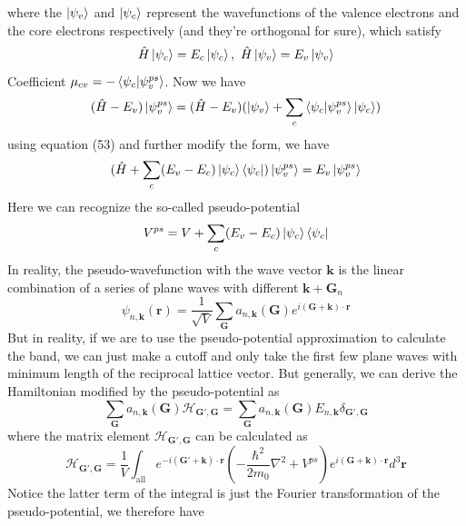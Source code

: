 \documentclass{article}
\begin{document}
where the $\ket{\psi_v}$ and $\ket{\psi_c}$ represent the wavefunctions of the valence electrons and the core electrons respectively (and they're orthogonal for sure), which satisfy\begin{equation}
    \hat{H}\ket{\psi_c}=E_c\ket{\psi_c},~\hat{H}\ket{\psi_v}=E_v\ket{\psi_v}
\end{equation}Coefficient $\mu_{cv}=-\braket{\psi_c|\psi_v^{ps}}$. Now we have\begin{equation}
    (\hat{H}-E_v)\ket{\psi_v^{ps}}=(\hat{H}-E_v)(\ket{\psi_v}+\sum_c\braket{\psi_c|\psi_v^{ps}}\ket{\psi_c})
\end{equation}using equation (53) and further modify the form, we have\begin{equation}
    (\hat{H}+\sum_c(E_v-E_c)\ket{\psi_c}\bra{\psi_c})\ket{\psi_v^{ps}}=E_v\ket{\psi_v^{ps}}
\end{equation}Here we can recognize the so-called pseudo-potential\begin{equation}
    V^{ps}=V+\sum_c(E_v-E_c)\ket{\psi_c}\bra{\psi_c}
\end{equation}In reality, the pseudo-wavefunction with the wave vector $\mathbf{k}$ is the linear combination of a series of plane waves with different $\mathbf{k}+\mathbf{G}_n$\begin{equation}
    \psi_{n,\mathbf{k}}(\mathbf{r})=\frac1{\sqrt{V}}\sum_{\mathbf{G}}a_{n,\mathbf{k}}(\mathbf{G})e^{i(\mathbf{G}+\mathbf{k})\cdot\mathbf{r}}
\end{equation}But in reality, if we are to use the pseudo-potential approximation to calculate the band, we can just make a cutoff and only take the first few plane waves with minimum length of the reciprocal lattice vector. But generally, we can derive the Hamiltonian modified by the pseudo-potential as\begin{equation}
    \sum_{\mathbf{G}}a_{n,\mathbf{k}}(\mathbf{G})\mathcal{H}_{\mathbf{G}',\mathbf{G}}=\sum_{\mathbf{G}}a_{n,\mathbf{k}}(\mathbf{G})E_{n,\mathbf{k}}\delta_{\mathbf{G}',\mathbf{G}}
\end{equation}where the matrix element $\mathcal{H}_{\mathbf{G}',\mathbf{G}}$ can be calculated as\begin{equation}
    \mathcal{H}_{\mathbf{G}',\mathbf{G}}=\frac{1}{V}\int_{\mathrm{all}}e^{-i(\mathbf{G}'+\mathbf{k})\cdot\mathbf{r}}(-\frac{\hbar^2}{2m_0}\nabla^2+V^{ps})e^{i(\mathbf{G}+\mathbf{k})\cdot\mathbf{r}}d^3\mathbf{r}
\end{equation}Notice the latter term of the integral is just the Fourier transformation of the pseudo-potential, we therefore have\begin{equation}

\end{equation}
\end{document}
